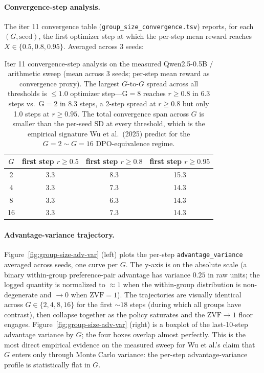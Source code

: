\paragraph{Convergence-step analysis.}
The iter 11 convergence table
(\texttt{group\_size\_convergence.tsv}) reports, for each $(G, \text{seed})$,
the first optimizer step at which the per-step mean reward reaches
$X \in \{0.5, 0.8, 0.95\}$. Averaged across 3 seeds:

\begin{table}[htbp]
\centering
\small
\begin{tabular}{cccc}
\toprule
$G$ & first step $r \ge 0.5$ & first step $r \ge 0.8$ & first step $r \ge 0.95$ \\
\midrule
2  & 3.3 & 8.3 & 15.3 \\
4  & 3.3 & 7.3 & 14.3 \\
8  & 3.3 & 6.3 & 14.3 \\
16 & 3.3 & 7.3 & 14.3 \\
\bottomrule
\end{tabular}
\caption{Iter 11 convergence-step analysis on the measured
Qwen2.5-0.5B / arithmetic sweep (mean across 3 seeds; per-step
mean reward as convergence proxy). The largest $G$-to-$G$ spread
across all thresholds is $\le 1.0$ optimizer step---G$=8$ reaches
$r \ge 0.8$ in 6.3 steps vs.\ G$=2$ in 8.3 steps, a 2-step spread at
$r \ge 0.8$ but only 1.0 steps at $r \ge 0.95$. The total convergence
span across $G$ is smaller than the per-seed SD at every threshold,
which is the empirical signature Wu et al.~(2025) predict for the
$G{=}2 \sim G{=}16$ DPO-equivalence regime.}
\label{tab:groupsize-convergence}
\end{table}

\paragraph{Advantage-variance trajectory.}
Figure~\ref{fig:group-size-adv-var} (left) plots the per-step
\texttt{advantage\_variance} averaged across seeds, one curve per $G$.
The y-axis is on the absolute scale (a binary within-group
preference-pair advantage has variance $0.25$ in raw units; the
logged quantity is normalized to $\approx 1$ when the within-group
distribution is non-degenerate and $\to 0$ when $\mathrm{ZVF}{=}1$).
The trajectories are visually identical across $G \in \{2, 4, 8, 16\}$
for the first $\sim 18$ steps (during which all groups have
contrast), then collapse together as the policy saturates and the
$\mathrm{ZVF} \to 1$ floor engages. Figure~\ref{fig:group-size-adv-var}
(right) is a boxplot of the last-10-step advantage variance by $G$;
the four boxes overlap almost perfectly. This is the most direct
empirical evidence on the measured sweep for Wu et al.'s claim that
$G$ enters only through Monte Carlo variance: the per-step
advantage-variance profile is statistically flat in $G$.

